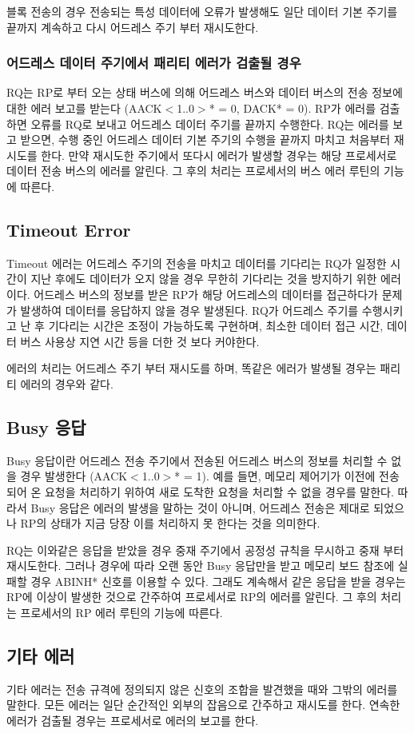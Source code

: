 블록 전송의 경우 전송되는 특성 데이터에 오류가 발생해도 일단 데이터 기본 주기를 끝까지 계속하고
다시 어드레스 주기 부터 재시도한다.

\subsubsection{어드레스 데이터 주기에서 패리티 에러가 검출될 경우}
RQ는 RP로 부터 오는 상태 버스에 의해 어드레스 버스와 데이터 버스의 전송 정보에 대한
에러 보고를 받는다 (AACK$<$1..0$>$* = 0, DACK* = 0).
RP가 에러를 검출하면 오류를 RQ로 보내고 어드레스 데이터 주기를 끝까지 수행한다.
RQ는 에러를 보고 받으면, 수행 중인 어드레스 데이터 기본 주기의 수행을 끝까지 마치고
처음부터 재시도를 한다.
만약 재시도한 주기에서 또다시 에러가 발생할 경우는 해당 프로세서로 데이터 전송 버스의 에러를 알린다.
그 후의 처리는 프로세서의 버스 에러 루틴의 기능에 따른다.

\subsection{Timeout Error}
Timeout 에러는 어드레스 주기의 전송을 마치고 데이터를 기다리는 RQ가 일정한 시간이
지난 후에도 데이터가 오지 않을 경우 무한히 기다리는 것을 방지하기 위한 에러이다.
어드레스 버스의 정보를 받은 RP가 해당 어드레스의 데이터를 접근하다가 문제가 발생하여
데이터를 응답하지 않을 경우 발생된다.
RQ가 어드레스 주기를 수행시키고 난 후 기다리는 시간은 조정이 가능하도록 구현하며,
최소한 데이터 접근 시간, 데이터 버스 사용상 지연 시간 등을 더한 것 보다 커야한다.

에러의 처리는 어드레스 주기 부터 재시도를 하며, 똑같은 에러가 발생될 경우는 패리티 에러의 경우와 같다.

\subsection{Busy 응답}
Busy 응답이란 어드레스 전송 주기에서 전송된 어드레스 버스의 정보를 처리할 수 없을 경우
발생한다 (AACK$<$1..0$>$* = 1).
예를 들면, 메모리 제어기가 이전에 전송되어 온
요청을 처리하기 위하여 새로 도착한 요청을 처리할 수 없을 경우를 말한다.
따라서 Busy 응답은 에러의 발생을 말하는 것이 아니며, 어드레스 전송은 제대로 되었으나
RP의 상태가 지금 당장 이를 처리하지 못 한다는 것을 의미한다.

RQ는 이와같은 응답을 받았을 경우 중재 주기에서 공정성 규칙을 무시하고 중재 부터 재시도한다.
그러나 경우에 따라 오랜 동안 Busy 응답만을 받고 메모리 보드 참조에 실패할 경우
ABINH* 신호를 이용할 수 있다. 그래도
계속해서 같은 응답을 받을 경우는 RP에 이상이 발생한 것으로 간주하여 프로세서로 RP의 에러를 알린다.
그 후의 처리는 프로세서의 RP 에러 루틴의 기능에 따른다.

\subsection{기타 에러}
기타 에러는 전송 규격에 정의되지 않은 신호의 조합을 발견했을 때와 그밖의 에러를 말한다.
모든 에러는 일단 순간적인 외부의 잡음으로 간주하고 재시도를 한다.
연속한 에러가 검출될 경우는 프로세서로 에러의 보고를 한다.
